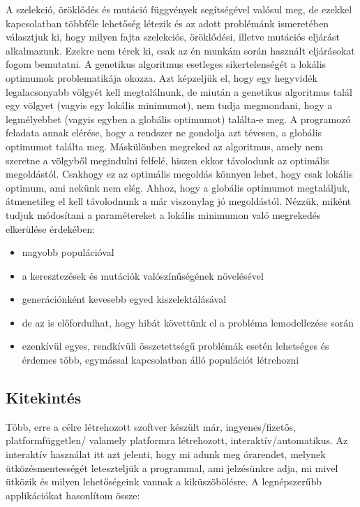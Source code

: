 \documentclass[12pt,a4paper]{report}
\begin{document}
A szelekció, öröklődés és mutáció függvények segítségével valósul meg, de ezekkel
kapcsolatban többféle lehetőség létezik és az adott problémánk ismeretében választjuk ki,
hogy milyen fajta szelekciós, öröklődési, illetve mutációs eljárást alkalmazunk. Ezekre nem
térek ki, csak az én munkám során használt eljárásokat fogom bemutatni.
A genetikus algoritmus esetleges sikertelenségét a lokális optimumok problematikája okozza. 
Azt képzeljük el, hogy egy hegyvidék legalacsonyabb völgyét kell megtalálnunk, de miután a
genetikus algoritmus talál egy völgyet (vagyis egy lokális minimumot), nem tudja megmondani,
hogy a legmélyebbet (vagyis egyben a globális optimumot) találta-e meg. A programozó feladata
annak elérése, hogy a rendszer ne gondolja azt tévesen, a globális optimumot találta meg. 
Máskülönben megreked az algoritmus, amely nem szeretne a völgyből megindulni felfelé, hiszen 
ekkor távolodunk az optimális megoldástól. Csakhogy ez az optimális megoldás könnyen lehet,
hogy csak lokális optimum, ami nekünk nem elég. Ahhoz, hogy a globális optimumot megtaláljuk,
átmenetileg el kell távolodnunk a már viszonylag jó megoldástól. Nézzük, miként tudjuk
módosítani a paramétereket a lokális minimumon való megrekedés elkerülése érdekében:

\begin{itemize}
    \item nagyobb populációval
    \item a keresztezések és mutációk valószínűségének növelésével
    \item generációnként kevesebb egyed kiszelektálásával
    \item de az is előfordulhat, hogy hibát követtünk el a probléma lemodellezése során
    \item ezenkívül egyes, rendkívüli összetettségű problémák esetén lehetséges és érdemes                 több, egymással kapcsolatban álló populációt létrehozni
\end{itemize}

\subsection{Kitekintés}

Több, erre a célre létrehozott szoftver készült már, ingyenes/fizetős, platformfüggetlen/
valamely platformra létrehozott, interaktív/automatikus. Az interaktív használat itt azt
jelenti, hogy mi adunk meg órarendet, melynek ütközésmentességét leteszteljük a programmal,
ami jelzésünkre adja, mi mivel ütközik és milyen lehetőségeink vannak a kiküszöbölésre. 
A legnépszerűbb applikációkat hasonlítom össze:
\end{document}
